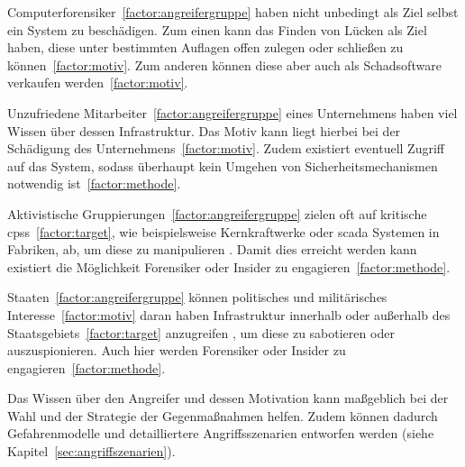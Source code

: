 \documentclass[final,bibliography=totocnumbered]{include/sikseminar}
\newcommand{\cps}{\glspl{cps}\xspace}
\begin{document}
Computerforensiker~\ref{factor:angreifergruppe} haben nicht unbedingt als Ziel selbst ein System zu beschädigen.
Zum einen kann das Finden von Lücken als Ziel haben, diese unter bestimmten Auflagen offen zulegen oder schließen zu können~\ref{factor:motiv}. 
Zum anderen können diese aber auch als Schadsoftware verkaufen werden~\ref{factor:motiv}. 

Unzufriedene Mitarbeiter~\ref{factor:angreifergruppe} eines Unternehmens haben viel Wissen über dessen Infrastruktur.
Das Motiv kann liegt hierbei bei der Schädigung des Unternehmens~\ref{factor:motiv}.
Zudem existiert eventuell Zugriff auf das System, sodass überhaupt kein Umgehen von Sicherheitsmechanismen notwendig ist~\ref{factor:methode}.~\cite{CAS+09,WYX+10}

Aktivistische Gruppierungen~\ref{factor:angreifergruppe} zielen oft auf kritische \cps~\ref{factor:target}, wie beispielsweise Kernkraftwerke oder \gls{scada} Systemen in Fabriken, ab, um diese zu manipulieren \cite{CAS+09,HLL+17}. 
Damit dies erreicht werden kann existiert die Möglichkeit Forensiker oder Insider zu engagieren~\ref{factor:methode}.~\cite{WYX+10}

Staaten~\ref{factor:angreifergruppe} können politisches und militärisches Interesse~\ref{factor:motiv} daran haben Infrastruktur innerhalb oder außerhalb des Staatsgebiets~\ref{factor:target} anzugreifen \cite{CAS+09}, um diese zu sabotieren oder auszuspionieren.
Auch hier werden Forensiker oder Insider zu engagieren~\ref{factor:methode}.

Das Wissen über den Angreifer und dessen Motivation kann maßgeblich bei der Wahl und der Strategie der Gegenmaßnahmen helfen.
Zudem können dadurch Gefahrenmodelle und detailliertere Angriffsszenarien entworfen werden (siehe Kapitel~\ref{sec:angriffszenarien}).
\end{document}
